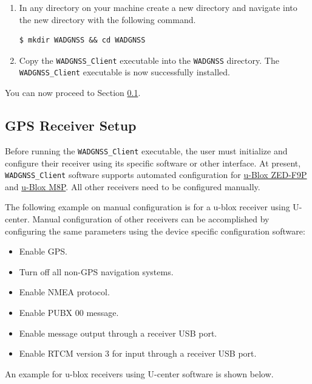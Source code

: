 \begin{enumerate}
\item In any directory on your machine create a new directory and  navigate into the new directory with the following command.
\begin{verbatim}
$ mkdir WADGNSS && cd WADGNSS 
\end{verbatim}

\item Copy the \texttt{WADGNSS\_Client} executable into the  \texttt{WADGNSS} directory. 
The \texttt{WADGNSS\_Client} executable is now successfully installed.
\end{enumerate}
You can now proceed to Section \ref{sect:RcvrSetup}.




\subsection{GPS Receiver Setup}\label{sect:RcvrSetup}
Before running the \texttt{WADGNSS\_Client} executable, the user must initialize and configure their receiver using its specific software or other interface.
%
At present, \texttt{WADGNSS\_Client} software supports automated configuration for \href{module}{u-Blox ZED-F9P} and \href{module}{u-Blox M8P}. All other receivers need to be configured manually.

The following example on manual configuration is for a u-blox receiver using U-center. 
Manual configuration of other receivers can be accomplished by configuring the same parameters using the device specific configuration software:
\begin{itemize}
\item Enable GPS.
\item Turn off all non-GPS navigation systems.
\item Enable NMEA protocol. 
\item Enable PUBX 00 message.
\item Enable message output through a receiver USB port.
\item Enable RTCM version 3 for  input through a receiver USB port.
\end{itemize}
An example for u-blox receivers using U-center software is shown below.

